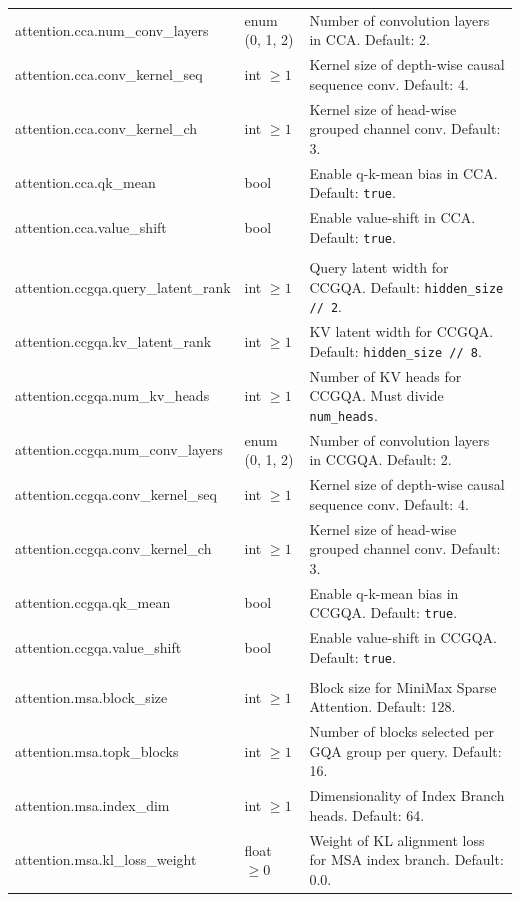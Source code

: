 \begin{longtable}{>{\ttfamily\footnotesize\raggedright\arraybackslash}p{5.6cm}>{\raggedright\arraybackslash}p{2.4cm}>{\raggedright\arraybackslash}p{6.9cm}}
attention.cca.num\_conv\_layers & enum (0, 1, 2) & Number of convolution layers in CCA. Default: 2. \\
attention.cca.conv\_kernel\_seq & int $\ge 1$ & Kernel size of depth-wise causal sequence conv. Default: 4. \\
attention.cca.conv\_kernel\_ch & int $\ge 1$ & Kernel size of head-wise grouped channel conv. Default: 3. \\
attention.cca.qk\_mean & bool & Enable q-k-mean bias in CCA. Default: \texttt{true}. \\
attention.cca.value\_shift & bool & Enable value-shift in CCA. Default: \texttt{true}. \\
\midrule
\multicolumn{3}{l}{\textit{model.attention.ccgqa.*}} \\
\midrule
attention.ccgqa.query\_latent\_rank & int $\ge 1$ & Query latent width for CCGQA. Default: \texttt{hidden\_size // 2}. \\
attention.ccgqa.kv\_latent\_rank & int $\ge 1$ & KV latent width for CCGQA. Default: \texttt{hidden\_size // 8}. \\
attention.ccgqa.num\_kv\_heads & int $\ge 1$ & Number of KV heads for CCGQA. Must divide \texttt{num\_heads}. \\
attention.ccgqa.num\_conv\_layers & enum (0, 1, 2) & Number of convolution layers in CCGQA. Default: 2. \\
attention.ccgqa.conv\_kernel\_seq & int $\ge 1$ & Kernel size of depth-wise causal sequence conv. Default: 4. \\
attention.ccgqa.conv\_kernel\_ch & int $\ge 1$ & Kernel size of head-wise grouped channel conv. Default: 3. \\
attention.ccgqa.qk\_mean & bool & Enable q-k-mean bias in CCGQA. Default: \texttt{true}. \\
attention.ccgqa.value\_shift & bool & Enable value-shift in CCGQA. Default: \texttt{true}. \\
\midrule
\multicolumn{3}{l}{\textit{model.attention.msa.*}} \\
\midrule
attention.msa.block\_size & int $\ge 1$ & Block size for MiniMax Sparse Attention. Default: 128. \\
attention.msa.topk\_blocks & int $\ge 1$ & Number of blocks selected per GQA group per query. Default: 16. \\
attention.msa.index\_dim & int $\ge 1$ & Dimensionality of Index Branch heads. Default: 64. \\
attention.msa.kl\_loss\_weight & float $\ge 0$ & Weight of KL alignment loss for MSA index branch. Default: 0.0. \\

\end{longtable}
